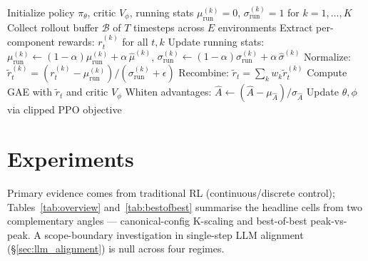 \documentclass[11pt,a4paper]{article}
\begin{document}
\begin{algorithm}[t]
\caption{PCZ-PPO (Running Z-Norm Variant)}
\begin{algorithmic}[1]
\STATE Initialize policy $\pi_\theta$, critic $V_\phi$, running stats $\mu_{\text{run}}^{(k)} = 0$, $\sigma_{\text{run}}^{(k)} = 1$ for $k = 1,\ldots,K$
  \STATE Collect rollout buffer $\mathcal{B}$ of $T$ timesteps across $E$ environments
  \STATE Extract per-component rewards: $r_t^{(k)}$ for all $t, k$
  \STATE Update running stats: $\mu_{\text{run}}^{(k)} \leftarrow (1-\alpha)\mu_{\text{run}}^{(k)} + \alpha\,\hat{\mu}^{(k)}$, \quad $\sigma_{\text{run}}^{(k)} \leftarrow (1-\alpha)\sigma_{\text{run}}^{(k)} + \alpha\,\hat{\sigma}^{(k)}$
  \STATE Normalize: $\tilde{r}_t^{(k)} = (r_t^{(k)} - \mu_{\text{run}}^{(k)}) / (\sigma_{\text{run}}^{(k)} + \epsilon)$
  \STATE Recombine: $\tilde{r}_t = \sum_k w_k \tilde{r}_t^{(k)}$
  \STATE Compute GAE with $\tilde{r}_t$ and critic $V_\phi$ 
  \STATE Whiten advantages: $\hat{A} \leftarrow (\hat{A} - \mu_{\hat{A}}) / \sigma_{\hat{A}}$
  \STATE Update $\theta, \phi$ via clipped PPO objective
\ENDFOR
\end{algorithmic}
\end{algorithm}

\section{Experiments}

Primary evidence comes from traditional RL (continuous/discrete control); Tables~\ref{tab:overview} and~\ref{tab:bestofbest} summarise the headline cells from two complementary angles --- canonical-config K-scaling and best-of-best peak-vs-peak. A scope-boundary investigation in single-step LLM alignment (§\ref{sec:llm_alignment}) is null across four regimes.
\end{document}
